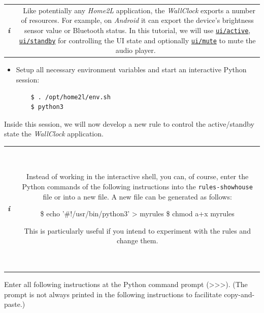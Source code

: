 \documentclass[12pt,english,parskip=half]{scrreprt}
\newcommand{\lst}[1]{\colorbox{lstbackground}{\ttfamily\footnotesize#1}}
\newcommand{\lstbox}[1]{
  \par
  \colorbox{lstbackground}{\ttfamily\footnotesize{\parbox{\linewidth}{#1}}}
  \par
}
\newcommand{\infobox}[1]{
  \hfill
  \setlength\arrayrulewidth{1pt}
  \begin{tabular}[t]{c|c|}
    \parbox{1.8em}{\hfill\textit{\Huge\textbf{i}\,}}
    &
    \,\parbox{0.89\linewidth}{\setlength{\parskip}{0.5em}#1}\,
  \end{tabular}
  \par
}
\newcommand{\rcref}[1]{\hyperref[rc:#1]{\texttt{#1}}}
\begin{document}
\infobox{
  Like potentially any \emph{Home2L} application, the \emph{WallClock}
  exports a number of resources. For example, on \emph{Android} it can export
  the device's brightness sensor value or Bluetooth status. In this tutorial, we will use
  \rcref{ui/active}, \rcref{ui/standby} for controlling the UI state and optionally
  \rcref{ui/mute} to mute the audio player.
}

\begin{itemize}[$\blacktriangleright$]

\item
  Setup all necessary environment variables and start an interactive Python session:
  \begin{lstlisting}
    $ . /opt/home2l/env.sh
    $ python3
  \end{lstlisting}

  \end{itemize}

Inside this session, we will now develop a new rule to control the
active/standby state the \emph{WallClock} application.

\infobox{
  Instead of working in the interactive shell, you can, of course, enter the
  Python commands of the following instructions into the \texttt{rules-showhouse}
  file or into a new file. A new file can be generated as follows:
  \lstbox{
    \$ echo '\#!/usr/bin/python3' > myrules
    \$ chmod a+x myrules
  }
  This is particularly useful if you intend to experiment with the rules and change them.
}

Enter all following instructions at the Python command prompt
(\lst{\mbox{\textgreater}\mbox{\textgreater}\mbox{\textgreater}}).
(The prompt is not always printed in the following instructions to facilitate copy-and-paste.)
\end{document}
